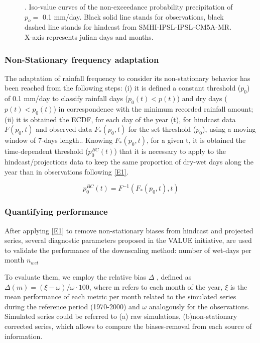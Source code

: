 \documentclass[a4paper,11pt]{article}
\begin{document}
\begin{figure}[H]  %
\centering
\caption{. Iso-value curves of the non-exceedance probability precipitation of $p_{o}=$ 0.1 mm/day. Black solid line stands for observations, black dashed line stands for hindcast from SMHI-IPSL-IPSL-CM5A-MR. X-axis represents julian days and months. }
\label{F1}
\end{figure}


\subsubsection{Non-Stationary frequency adaptation} 
The adaptation of rainfall frequency to consider its non-stationary behavior has been reached from the following steps: (i) it is defined a constant threshold ($p_{0}$) of 0.1 mm/day to classify rainfall days ($p_{0}(t) < p(t)$) and dry days ($p(t) < p_{0}(t)$) in correspondence with the minimum recorded rainfall amount; (ii) it is obtained the ECDF, for each day of the year (t), for hindcast data $F(p_{0}  ,t)$ and observed data $F_{*} (p_{0}  ,t)$ for the set threshold ($p_{0}$), using a moving window of 7-days length.. Knowing $F_{*}(p_{0},t)$,  for a given t, it is obtained the time-dependent threshold ($p_0^{BC}(t)$) that it is necessary to apply to the hindcast/projections data to keep the same proportion of dry-wet days along the year than in observations following \ref{E1}.

\begin{equation}
p_0^{BC}(t) = F^{-1}(F_*(p_0,t),t)
\label{E1}
\end{equation}

\subsubsection{Quantifying performance} 
After applying \ref{E1} to remove non-stationary biases from hindcast and projected series, several diagnostic parameters proposed in the VALUE initiative, are used to validate the performance of the downscaling method: number of wet-days per month $n_{wet}$

To evaluate them, we employ the relative bias $\Delta$ \cite{bib9}, defined as $\Delta(m) =(\xi-\omega)/\omega \cdot 100$, where m refers to each month of the year, $\xi$ is the mean performance of each metric per month related to the simulated series during the reference period (1970-2000) and $\omega$ analogously for the observations. Simulated series could be referred to (a) raw simulations, (b)non-stationary corrected series, which allows to compare the biases-removal from each source of information. 
\end{document}
